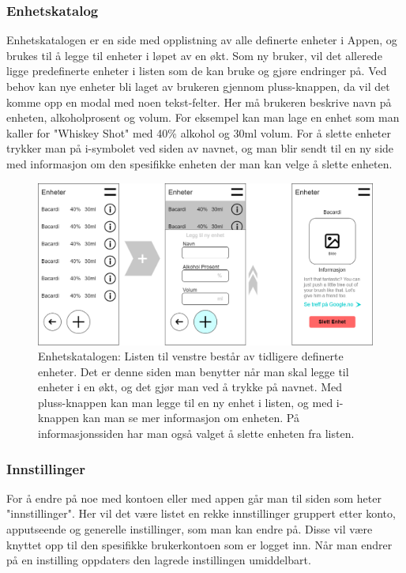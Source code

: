 \subsubsection{Enhetskatalog}
Enhetskatalogen er en side med opplistning av alle definerte enheter i Appen, og brukes til å legge til enheter i løpet av en økt. Som ny bruker, vil det allerede ligge predefinerte enheter i listen som de kan bruke og gjøre endringer på. Ved behov kan nye enheter bli laget av brukeren gjennom pluss-knappen, da vil det komme opp en modal med noen tekst-felter. Her må brukeren beskrive navn på enheten, alkoholprosent og volum. For eksempel kan man lage en enhet som man kaller for "Whiskey Shot" med 40\% alkohol og 30ml volum. For å slette enheter trykker man på i-symbolet ved siden av navnet, og man blir sendt til en ny side med informasjon om den spesifikke enheten der man kan velge å slette enheten.

\begin{figure}[H]
    \centering
    \includegraphics[scale=0.4]{images/lille_promille_unitcatalog.drawio.png}
    \caption{Enhetskatalogen: Listen til venstre består av tidligere definerte enheter. Det er denne siden man benytter når man skal legge til enheter i en økt, og det gjør man ved å trykke på navnet. Med pluss-knappen kan man legge til en ny enhet i listen, og med i-knappen kan man se mer informasjon om enheten. På informasjonssiden har man også valget å slette enheten fra listen.}
\end{figure}

\subsubsection{Innstillinger}
For å endre på noe med kontoen eller med appen går man til siden som heter "innstillinger". Her vil det være listet en rekke innstillinger gruppert etter konto, apputseende og generelle instillinger, som man kan endre på. Disse vil være knyttet opp til den spesifikke brukerkontoen som er logget inn. Når man endrer på en instilling oppdaters den lagrede instillingen umiddelbart.

